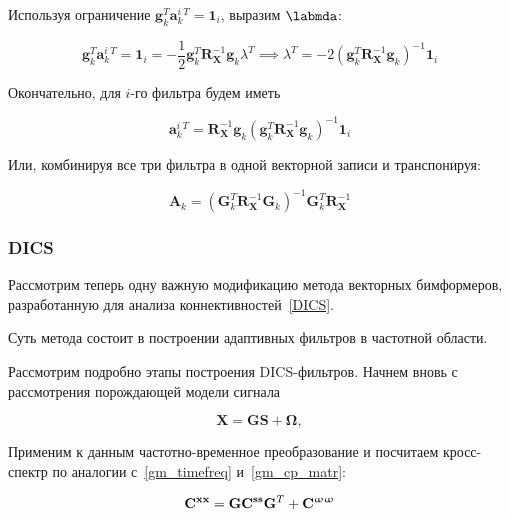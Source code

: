 Используя ограничение $\mathbf{g}_k^T \mathbf{a}_k^i^T = \mathbf{1}_i$, выразим $\labmda$:

\begin{equation}
    \mathbf{g}_k^T \mathbf{a}_k^i^T = \mathbf{1}_i =
    - \frac{1}{2}\mathbf{g}_k^T\mathbf{R}_\mathbf{X}^{-1} \mathbf{g}_k \lambda^T \implies
    \lambda^T = - 2{(\mathbf{g}_k^T\mathbf{R}_\mathbf{X}^{-1} \mathbf{g}_k)}^{-1} \mathbf{1}_i
\end{equation}

Окончательно, для $i$-го фильтра будем иметь

\begin{equation}
    \mathbf{a}_k^i^T = \mathbf{R}_\mathbf{X}^{-1} \mathbf{g}_k{(\mathbf{g}_k^T\mathbf{R}_\mathbf{X}^{-1} \mathbf{g}_k)}^{-1} \mathbf{1}_i
    \label{lcmv_filters_vec_comp}
\end{equation}

Или, комбинируя все три фильтра в одной векторной записи и транспонируя:

\begin{equation}
    \mathbf{A}_k =
    {(\mathbf{G}_k^T\mathbf{R}_\mathbf{X}^{-1} \mathbf{G}_k)}^{-1} \mathbf{G}_k^T \mathbf{R}_\mathbf{X}^{-1}
    \label{lcmv_filters_vec}
\end{equation}

\subsubsection{DICS}
\label{DICS_subsection}
Рассмотрим теперь одну важную модификацию метода векторных бимформеров,
разработанную для анализа коннективностей~\ref{DICS}.

Суть метода состоит в построении адаптивных фильтров в частотной области.

Рассмотрим подробно этапы построения DICS-фильтров.
Начнем вновь с рассмотрения порождающей модели сигнала

\begin{equation}
    \mathbf{X} = \mathbf{G} \mathbf{S} + \mathbf{\Omega},
    \label{gm_dics}
\end{equation}


Применим к данным частотно-временное преобразование и посчитаем кросс-спектр по аналогии
с~\ref{gm_timefreq} и~\ref{gm_cp_matr}:

\begin{gather}
    \mathbf{C}^{\mathbf{x x}} = \mathbf{G} \mathbf{C}^{\mathbf{s s}} \mathbf{G}^T + \mathbf{C}^{\mathbf{\upomega \upomega}}
    \label{gm_cp_matr}
\end{gather}

